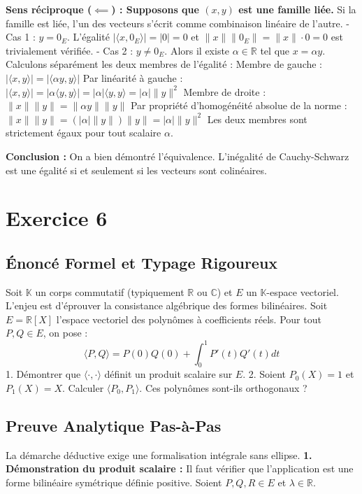 \documentclass[11pt,a4paper]{report}
\begin{document}
\textbf{Sens réciproque ($\impliedby$) : Supposons que $(x, y)$ est une famille liée.}
Si la famille est liée, l'un des vecteurs s'écrit comme combinaison linéaire de l'autre.
- Cas 1 : $y = 0_E$. L'égalité $|\langle x, 0_E \rangle| = |0| = 0$ et $\|x\|\|0_E\| = \|x\| \cdot 0 = 0$ est trivialement vérifiée.
- Cas 2 : $y \neq 0_E$. Alors il existe $\alpha \in \mathbb{R}$ tel que $x = \alpha y$.
Calculons séparément les deux membres de l'égalité :
Membre de gauche :
$|\langle x, y \rangle| = |\langle \alpha y, y \rangle|$
Par linéarité à gauche :
$|\langle x, y \rangle| = |\alpha \langle y, y \rangle| = |\alpha| \langle y, y \rangle = |\alpha| \|y\|^2$
Membre de droite :
$\|x\| \|y\| = \|\alpha y\| \|y\|$
Par propriété d'homogénéité absolue de la norme :
$\|x\| \|y\| = (|\alpha| \|y\|) \|y\| = |\alpha| \|y\|^2$
Les deux membres sont strictement égaux pour tout scalaire $\alpha$.

\textbf{Conclusion :}
On a bien démontré l'équivalence. L'inégalité de Cauchy-Schwarz est une égalité si et seulement si les vecteurs sont colinéaires.


\section{Exercice 6}


\subsection*{Énoncé Formel et Typage Rigoureux}
Soit $\mathbb{K}$ un corps commutatif (typiquement $\mathbb{R}$ ou $\mathbb{C}$) et $E$ un $\mathbb{K}$-espace vectoriel. L'enjeu est d'éprouver la consistance algébrique des formes bilinéaires.
Soit $E = \mathbb{R}[X]$ l'espace vectoriel des polynômes à coefficients réels.
Pour tout $P, Q \in E$, on pose :
$$\langle P, Q \rangle = P(0)Q(0) + \int_0^1 P'(t)Q'(t) dt$$
1. Démontrer que $\langle \cdot, \cdot \rangle$ définit un produit scalaire sur $E$.
2. Soient $P_0(X) = 1$ et $P_1(X) = X$. Calculer $\langle P_0, P_1 \rangle$. Ces polynômes sont-ils orthogonaux ?

\subsection*{Preuve Analytique Pas-à-Pas}
La démarche déductive exige une formalisation intégrale sans ellipse.
\textbf{1. Démonstration du produit scalaire :}
Il faut vérifier que l'application est une forme bilinéaire symétrique définie positive.
Soient $P, Q, R \in E$ et $\lambda \in \mathbb{R}$.
\end{document}
